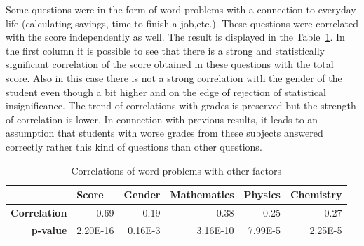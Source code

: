 Some questions were in the form of word problems with a connection to everyday life (calculating savings, time to finish a job,etc.). These questions were correlated with the score independently as well. The result is displayed in the Table~\ref{tab:corr2}. In the first column it is possible to see that there is a strong and statistically significant correlation of the score obtained in these questions with the total score. Also in this case there is not a strong correlation with the gender of the student even though a bit higher and on the edge of rejection of statistical insignificance. The trend of correlations with grades is preserved but the strength of correlation is lower. In connection with previous results, it leads to an assumption that students with worse grades from these subjects answered correctly rather this kind of questions than other questions.

\begin{table}[htbp]%
\caption{Correlations of word problems with other factors}
\label{tab:corr2}
\begin{center}
    \begin{tabular}{rrrrrr}
    \hline
    \multicolumn{1}{l}{\textbf{}} & \multicolumn{1}{l}{\textbf{Score}} & \multicolumn{1}{l}{\textbf{Gender}} & \multicolumn{1}{l}{\textbf{Mathematics}} & \multicolumn{1}{l}{\textbf{Physics}} & \multicolumn{1}{l}{\textbf{Chemistry}} \\
    \hline
    \textbf{Correlation}& 0.69  & -0.19  & -0.38  & -0.25  & -0.27  \\
		\textbf{p-value}& 2.20E-16   & 0.16E-3  & 3.16E-10  & 7.99E-5   & 2.25E-5   \\
    \hline
    \end{tabular}%
\end{center}
\end{table}
